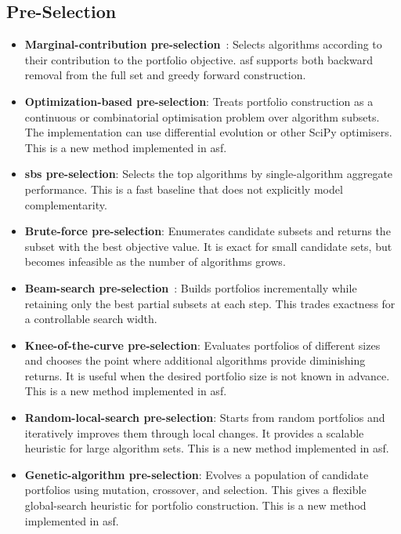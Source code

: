 \subsection{Pre-Selection}
\begin{itemize}
    \item \textbf{Marginal-contribution pre-selection}~\citep{XuEtAl08}: Selects algorithms according to their contribution to the portfolio objective. \gls{asf} supports both backward removal from the full set and greedy forward construction.
    \item \textbf{Optimization-based pre-selection}: Treats portfolio construction as a continuous or combinatorial optimisation problem over algorithm subsets. The implementation can use differential evolution or other SciPy optimisers. This is a new method implemented in \gls{asf}.
    \item \textbf{\gls{sbs} pre-selection}: Selects the top algorithms by single-algorithm aggregate performance. This is a fast baseline that does not explicitly model complementarity.
    \item \textbf{Brute-force pre-selection}: Enumerates candidate subsets and returns the subset with the best objective value. It is exact for small candidate sets, but becomes infeasible as the number of algorithms grows.
    \item \textbf{Beam-search pre-selection}~\citep{BacEtAl22}: Builds portfolios incrementally while retaining only the best partial subsets at each step. This trades exactness for a controllable search width.
    \item \textbf{Knee-of-the-curve pre-selection}: Evaluates portfolios of different sizes and chooses the point where additional algorithms provide diminishing returns. It is useful when the desired portfolio size is not known in advance. This is a new method implemented in \gls{asf}.
    \item \textbf{Random-local-search pre-selection}: Starts from random portfolios and iteratively improves them through local changes. It provides a scalable heuristic for large algorithm sets. This is a new method implemented in \gls{asf}.
    \item \textbf{Genetic-algorithm pre-selection}: Evolves a population of candidate portfolios using mutation, crossover, and selection. This gives a flexible global-search heuristic for portfolio construction. This is a new method implemented in \gls{asf}.
\end{itemize}

